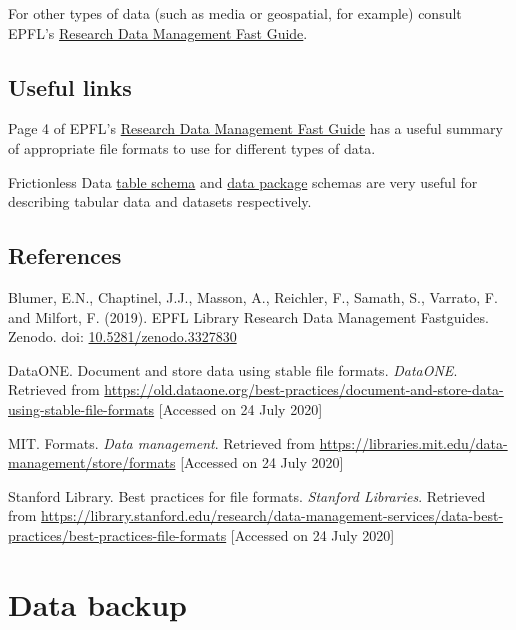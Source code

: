 \documentclass[12pt,a4paper,oneside]{report}
\begin{document}
For other types of data (such as media or geospatial, for example)
consult EPFL's
\href{https://www.epfl.ch/campus/library/wp-content/uploads/2019/09/EPFL_Library_RDM_FastGuide_All.pdf\#page=4}{Research
Data Management Fast Guide}.

\hypertarget{useful-links}{%
\section{Useful links}\label{useful-links}}

Page 4 of EPFL's
\href{https://www.epfl.ch/campus/library/wp-content/uploads/2019/09/EPFL_Library_RDM_FastGuide_All.pdf\#page=4}{Research
Data Management Fast Guide} has a useful summary of appropriate file
formats to use for different types of data.

Frictionless Data
\href{https://specs.frictionlessdata.io/table-schema/}{table schema} and
\href{https://specs.frictionlessdata.io/data-package/}{data package}
schemas are very useful for describing tabular data and datasets
respectively.

\hypertarget{references-3}{%
\section{References}\label{references-3}}

Blumer, E.N., Chaptinel, J.J., Masson, A., Reichler, F., Samath, S.,
Varrato, F. and Milfort, F. (2019). EPFL Library Research Data
Management Fastguides. Zenodo. doi:
\href{https://doi.org/10.5281/zenodo.3327830}{10.5281/zenodo.3327830}

DataONE. Document and store data using stable file formats.
\emph{DataONE}. Retrieved from
\url{https://old.dataone.org/best-practices/document-and-store-data-using-stable-file-formats}
{[}Accessed on 24 July 2020{]}

MIT. Formats. \emph{Data management}. Retrieved from
\href{https://libraries.mit.edu/data-management/store/formats/}{https://libraries.mit.edu/data-management/store/formats}
{[}Accessed on 24 July 2020{]}

Stanford Library. Best practices for file formats. \emph{Stanford
Libraries}. Retrieved from
\url{https://library.stanford.edu/research/data-management-services/data-best-practices/best-practices-file-formats}
{[}Accessed on 24 July 2020{]}

\hypertarget{data-backup}{%
\chapter{Data backup}\label{data-backup}}
\end{document}
